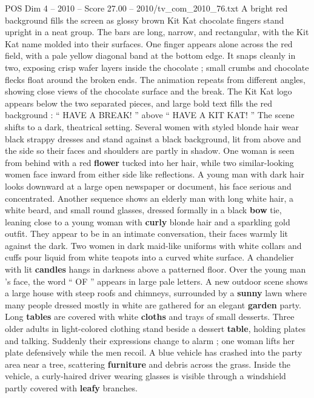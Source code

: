 \begin{textsample}{POS Dim 4 – 2010 – Score 27.00 – 2010/tv\_com\_2010\_76.txt}  \label{ex:f4_pos_021}
A bright red background fills the screen as glossy brown Kit Kat chocolate fingers stand upright in a neat group.
The bars are long, narrow, and rectangular, with the Kit Kat name molded into their surfaces.
One finger appears alone across the red field, with a pale yellow diagonal band at the bottom edge.
It snaps cleanly in two, exposing crisp wafer layers inside the chocolate ; small crumbs and chocolate flecks float around the broken ends.
The animation repeats from different angles, showing close views of the chocolate surface and the break.
The Kit Kat logo appears below the two separated pieces, and large bold text fills the red background : “ HAVE A BREAK! ” above “ HAVE A KIT KAT! ” The scene shifts to a dark, theatrical setting.
Several women with styled blonde hair wear black strappy dresses and stand against a black background, lit from above and the side so their faces and shoulders are partly in shadow.
One woman is seen from behind with a red \textbf{flower} tucked into her hair, while two similar-looking women face inward from either side like reflections.
A young man with dark hair looks downward at a large open newspaper or document, his face serious and concentrated.
Another sequence shows an elderly man with long white hair, a white beard, and small round glasses, dressed formally in a black \textbf{bow} tie, leaning close to a young woman with \textbf{curly} blonde hair and a sparkling gold outfit.
They appear to be in an intimate conversation, their faces warmly lit against the dark.
Two women in dark maid-like uniforms with white collars and cuffs pour liquid from white teapots into a curved white surface.
A chandelier with lit \textbf{candles} hangs in darkness above a patterned floor.
Over the young man ’s face, the word “ OF ” appears in large pale letters.
A new outdoor scene shows a large house with steep roofs and chimneys, surrounded by a \textbf{sunny} lawn where many people dressed mostly in white are gathered for an elegant \textbf{garden} party.
Long \textbf{tables} are covered with white \textbf{cloths} and trays of small desserts.
Three older adults in light-colored clothing stand beside a dessert \textbf{table}, holding plates and talking.
Suddenly their expressions change to alarm ; one woman lifts her plate defensively while the men recoil.
A blue vehicle has crashed into the party area near a tree, scattering \textbf{furniture} and debris across the grass.
Inside the vehicle, a curly-haired driver wearing glasses is visible through a windshield partly covered with \textbf{leafy} branches.

\end{textsample}
